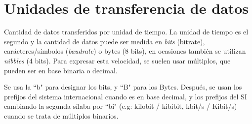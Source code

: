 \documentclass[a4paper, 11pt]{report} %
\begin{document}
\glsaddall
\renewcommand{\glsnamefont}[1]{\makefirstuc{#1}}
\printglossary[style=mcolindex, title=Glosario y acrónimos, toctitle=Glosario y acrónimos]

\nocite{*}
\printbibliography

\listoffigures

\appendix
\chapter{Unidades de transferencia de datos}
Cantidad de datos transferidos por unidad de tiempo. La unidad de tiempo es el segundo y la cantidad de datos puede ser medida en \textit{\glspl{bit}} (bitrate), carácteres/símbolos (\textit{baudrate}) o bytes (8 bits), en ocasiones también se utilizan \textit{nibbles} (4 bits). Para expresar esta velocidad, se suelen usar múltiplos, que pueden ser en base binaria o decimal.

Se usa la ``b" para designar los bits, y ``B" para los Bytes. Después, se usan los prefijos del sistema internacional cuando es en base decimal, y los prefijos del SI cambiando la segunda sílaba por ``bi" (e.g: kilobit / kibibit, kbit/s / Kibit/s) cuando se trata de múltiplos binarios.
\end{document}
